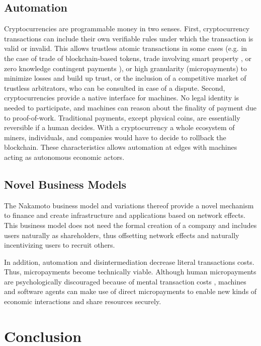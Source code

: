\subsection{Automation}

Cryptocurrencies are programmable money in two senses. First, cryptocurrency transactions can include their own verifiable rules under which the transaction is valid or invalid. This allows trustless atomic transactions in some cases (e.g. in the case of trade of blockchain-based tokens, trade involving smart property \parencite{smartcontr}, or zero knowledge contingent payments \parencite{maxwell2016zk}), or high granularity (micropayments) to minimize losses and build up trust, or the inclusion of a competitive market of trustless arbitrators, who can be consulted in case of a dispute. Second, cryptocurrencies provide a native interface for machines. No legal identity is needed to participate, and machines can reason about the finality of payment due to proof-of-work. Traditional payments, except physical coins, are essentially reversible if a human decides. With a cryptocurrency a whole ecosystem of miners, individuals, and companies would have to decide to rollback the blockchain. These characteristics allows automation at edges with machines acting as autonomous economic actors.

\subsection{Novel Business Models}

The Nakamoto business model and variations thereof provide a novel mechanism to finance and create infrastructure and applications based on network effects. This business model does not need the formal creation of a company and includes users naturally as shareholders, thus offsetting network effects and naturally incentivizing users to recruit others.

In addition, automation and disintermediation decrease literal transactions costs. Thus, micropayments become technically viable. Although human micropayments are psychologically discouraged because of mental transaction costs \parencite{szabo1999micropayments}, machines and software agents can make use of direct micropayments to enable new kinds of economic interactions and share resources securely. 


\section{Conclusion}

